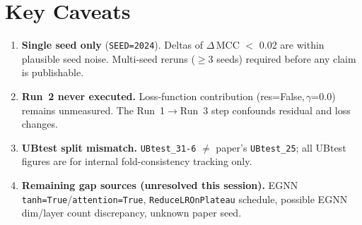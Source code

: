 \documentclass[10pt, a4paper]{article}
\newcommand{\code}[1]{\texttt{\small #1}}
\begin{document}
\section*{Key Caveats}

\begin{enumerate}[leftmargin=1.5em, itemsep=2pt, topsep=3pt]
    \item \textbf{Single seed only} (\code{SEED=2024}).
    Deltas of $\Delta$\,MCC $<$ 0.02 are within plausible seed noise.
    Multi-seed reruns ($\geq$3 seeds) required before any claim is publishable.

    \item \textbf{Run~2 never executed.}
    Loss-function contribution (res=False,$\,\gamma$=0.0) remains unmeasured.
    The Run~1$\to$Run~3 step confounds residual and loss changes.

    \item \textbf{UBtest split mismatch.}
    \texttt{UBtest\_31-6} $\neq$ paper's \texttt{UBtest\_25}; all UBtest figures are for
    internal fold-consistency tracking only.

    \item \textbf{Remaining gap sources (unresolved this session).}
    EGNN \code{tanh=True}/\code{attention=True}, \code{ReduceLROnPlateau} schedule,
    possible EGNN dim/layer count discrepancy, unknown paper seed.
\end{enumerate}
\end{document}
